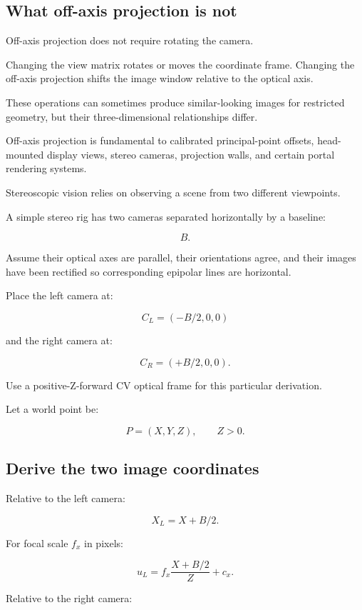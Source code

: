 \subsection{What off-axis projection is not}\label{02-foundations-ii-ch035-what-off-axis-projection-is-not}

Off-axis projection does not require rotating the camera.

Changing the view matrix rotates or moves the coordinate frame. Changing the off-axis projection shifts the image window relative to the optical axis.

These operations can sometimes produce similar-looking images for restricted geometry, but their three-dimensional relationships differ.

Off-axis projection is fundamental to calibrated principal-point offsets, head-mounted display views, stereo cameras, projection walls, and certain portal rendering systems.

Stereoscopic vision relies on observing a scene from two different viewpoints.

A simple stereo rig has two cameras separated horizontally by a baseline:

\[ \boxed{B}. \]

Assume their optical axes are parallel, their orientations agree, and their images have been rectified so corresponding epipolar lines are horizontal.

Place the left camera at:

\[ C_L=(-B/2,0,0) \]

and the right camera at:

\[ C_R=(+B/2,0,0). \]

Use a positive-Z-forward CV optical frame for this particular derivation.

Let a world point be:

\[ P=(X,Y,Z),\qquad Z>0. \]

\subsection{Derive the two image coordinates}\label{02-foundations-ii-ch035-derive-the-two-image-coordinates}

Relative to the left camera:

\[ X_L=X+B/2. \]

For focal scale \(f_x\) in pixels:

\[ \boxed{ u_L=f_x\frac{X+B/2}{Z}+c_x. } \]

Relative to the right camera:

